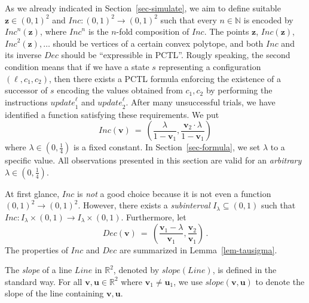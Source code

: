 \documentclass[a4paper,UKenglish,cleveref, autoref, thm-restate]{lipics-v2021}
\newcommand{\N}{\mathbb{N}}
\newcommand{\R}{\mathbb{R}}
\newcommand{\Line}{\mathit{Line}}
\newcommand{\slope}{\mathit{slope}}
\newcommand{\INC}{\mathit{Inc}}
\newcommand{\DEC}{\mathit{Dec}}
\renewcommand{\vec}[1]{\pmb{#1}}
\newcommand{\update}{\textit{update}}
\begin{document}
As we already indicated in Section~\ref{sec-simulate}, we aim to define suitable $\vec{z} \in (0,1)^2$ and  $\INC : (0,1)^2 \to (0,1)^2$ such that every $n \in \N$  is encoded by $\INC^n(\vec{z})$, where $\INC^n$ is the $n$-fold composition of $\INC$. The points $\vec{z}$, $\INC(\vec{z})$, $\INC^2(\vec{z}),\ldots$ should be vertices of a certain convex polytope, and both $\INC$ and its inverse $\DEC$ should be ``expressible in PCTL''. Rougly speaking, the second condition means that if we have a state $s$ representing a configuration $(\ell,c_1,c_2)$, then there exists a PCTL formula enforcing the existence of a successor of $s$ encoding the values obtained from $c_1,c_2$ by performing the instructions $\update_1^\ell$ and $\update_2^\ell$. After many unsuccessful trials, we have identified a function satisfying these requirements. We put
\[
   \INC(\vec{v}) \ = \ \left(\frac{\lambda}{1-\vec{v}_1}, \frac{\vec{v}_2 \cdot \lambda}{1-\vec{v}_1}\right)
\]
where $\lambda \in (0,\frac{1}{4})$ is a fixed constant. In Section~\ref{sec-formula}, we set $\lambda$ to a specific value. All observations presented in this section are valid for an \emph{arbitrary} $\lambda \in (0,\frac{1}{4})$.

At first glance, $\INC$ is \emph{not} a good choice because it is not even a function $(0,1)^2 \to (0,1)^2$. However, there exists a \emph{subinterval} $I_\lambda \subseteq (0,1)$ such that $\INC : I_\lambda \times (0,1) \to I_\lambda \times (0,1)$. Furthermore, let
\[
   \DEC(\vec{v}) \ = \ \left(\frac{\vec{v}_1 - \lambda}{\vec{v}_1}, \frac{\vec{v}_2}{\vec{v}_1}\right)\,.
\]
The properties of $\INC$ and $\DEC$ are summarized in Lemma~\ref{lem-tausigma}. 

The \emph{slope} of a line $\Line$ in $\R^2$, denoted by $\slope(\Line)$, is defined in the standard way. For all $\vec{v},\vec{u} \in \R^2$ where $\vec{v}_1 \neq \vec{u}_1$, we use $\slope(\vec{v},\vec{u})$ to denote the slope of the line containing $\vec{v},\vec{u}$.
\end{document}
